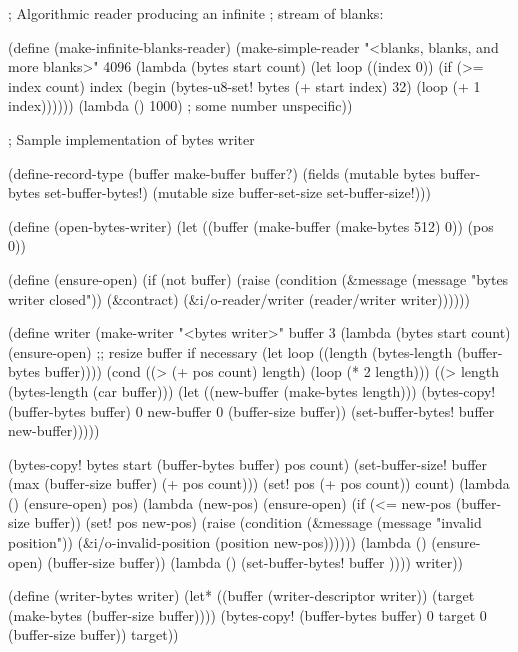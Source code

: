\begin{schemenoindent}
; Algorithmic reader producing an infinite
; stream of blanks:

(define (make-infinite-blanks-reader)
  (make-simple-reader
    "<blanks, blanks, and more blanks>"
    \schfalse{}
    4096
    (lambda (bytes start count)
      (let loop ((index 0))
        (if (>= index count)
            index
            (begin
              (bytes-u8-set! bytes (+ start index) 32)
              (loop (+ 1 index))))))
    (lambda ()
      1000) ; some number
    \schfalse{} \schfalse{} \schfalse{}
    unspecific))
 
; Sample implementation of bytes writer

(define-record-type (buffer
                     make-buffer buffer?)
  (fields (mutable bytes
                   buffer-bytes set-buffer-bytes!)
          (mutable size
                   buffer-set-size set-buffer-size!)))

(define (open-bytes-writer)
  (let ((buffer
         (make-buffer (make-bytes 512) 0))
        (pos 0))

    (define (ensure-open)
      (if (not buffer)
          (raise (condition
                  (\&message
                   (message "bytes writer closed"))
                  (\&contract)
                  (\&i/o-reader/writer
                   (reader/writer writer))))))

    (define writer
      (make-writer
       "<bytes writer>"
       buffer
       3
       (lambda (bytes start count)
         (ensure-open)
         ;; resize buffer if necessary
         (let loop ((length 
                     (bytes-length
                       (buffer-bytes buffer))))
           (cond
            ((> (+ pos count) length)
             (loop (* 2 length)))
            ((> length (bytes-length (car buffer)))
             (let ((new-buffer (make-bytes length)))
               (bytes-copy! (buffer-bytes buffer) 0
                            new-buffer 0
                            (buffer-size buffer))
               (set-buffer-bytes! buffer new-buffer)))))

         (bytes-copy! bytes start
                      (buffer-bytes buffer) pos
                      count)
         (set-buffer-size!
           buffer
           (max (buffer-size buffer) (+ pos count)))
         (set! pos (+ pos count))
         count)
       (lambda ()
         (ensure-open)
         pos)
       (lambda (new-pos)
         (ensure-open)
         (if (<= new-pos (buffer-size buffer))
             (set! pos new-pos)
             (raise
              (condition
               (\&message
                (message "invalid position"))
               (\&i/o-invalid-position
                (position new-pos))))))
       (lambda ()
         (ensure-open)
         (buffer-size buffer))
       (lambda ()
         (set-buffer-bytes! buffer \schfalse{}))))
    writer))

(define (writer-bytes writer)
  (let* ((buffer (writer-descriptor writer))
         (target (make-bytes (buffer-size buffer))))
    (bytes-copy! (buffer-bytes buffer) 0
                 target 0
                 (buffer-size buffer))
    target))
\end{schemenoindent}
                
